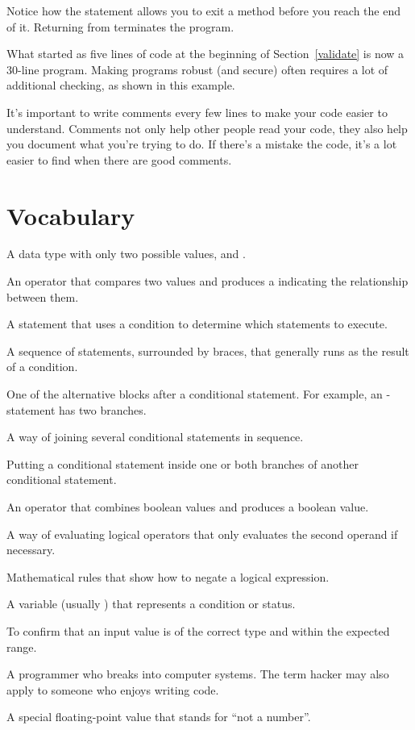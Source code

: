 
Notice how the  statement allows you to exit a method before you reach the end of it.
Returning from  terminates the program.

What started as five lines of code at the beginning of Section~\ref{validate} is now a 30-line program.
Making programs robust (and secure) often requires a lot of additional checking, as shown in this example.


It's important to write comments every few lines to make your code easier to understand.
Comments not only help other people read your code, they also help you document what you're trying to do.
If there's a mistake the code, it's a lot easier to find when there are good comments.


\section{Vocabulary}

\begin{description}

A data type with only two possible values,  and .

An operator that compares two values and produces a  indicating the relationship between them.

A statement that uses a condition to determine which statements to execute.

A sequence of statements, surrounded by braces, that generally runs as the result of a condition.

One of the alternative blocks after a conditional statement.
For example, an - statement has two branches.

A way of joining several conditional statements in sequence.

Putting a conditional statement inside one or both branches of another conditional statement.

An operator that combines boolean values and produces a boolean value.

A way of evaluating logical operators that only evaluates the second operand if necessary.

Mathematical rules that show how to negate a logical expression.

A variable (usually ) that represents a condition or status.

To confirm that an input value is of the correct type and within the expected range.

A programmer who breaks into computer systems.
The term hacker may also apply to someone who enjoys writing code.

A special floating-point value that stands for ``not a number''.

\end{description}


